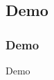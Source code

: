 \subsection{Demo}
\begin{frame}\frametitle{Demo}
\begin{alertblock}{Demo}
	\end{alertblock}
\end{frame}